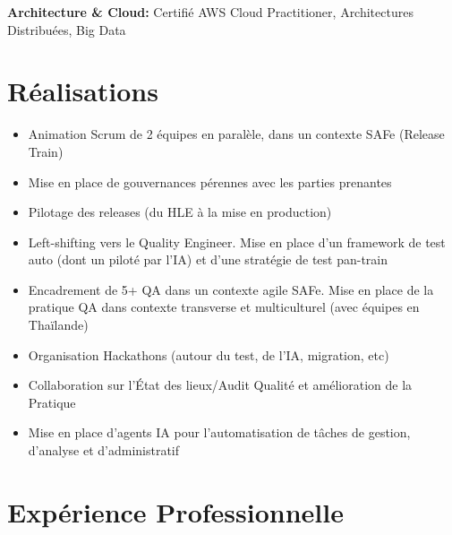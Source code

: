 \documentclass[11pt,a4paper]{article}
\begin{document}
\textbf{Architecture \& Cloud:} Certifié AWS Cloud Practitioner, Architectures Distribuées, Big Data


\vspace{6pt}

\section*{Réalisations}
\begin{itemize}
    \item Animation Scrum de 2 équipes en paralèle, dans un contexte SAFe (Release Train)
    \item Mise en place de gouvernances pérennes avec les parties prenantes
    \item Pilotage des releases (du HLE à la mise en production)
    \item Left-shifting vers le Quality Engineer. Mise en place d'un framework de test auto (dont un piloté par l'IA) et d'une stratégie de test pan-train
    \item Encadrement de 5+ QA dans un contexte agile SAFe. Mise en place de la pratique QA dans contexte transverse et multiculturel (avec équipes en Thaïlande)
    \item Organisation Hackathons (autour du test, de l'IA, migration, etc)
    \item Collaboration sur l'État des lieux/Audit Qualité et amélioration de la Pratique
    \item Mise en place d'agents IA pour l'automatisation de tâches de gestion, d'analyse et d'administratif
\end{itemize}

\section*{Expérience Professionnelle}
\end{document}
